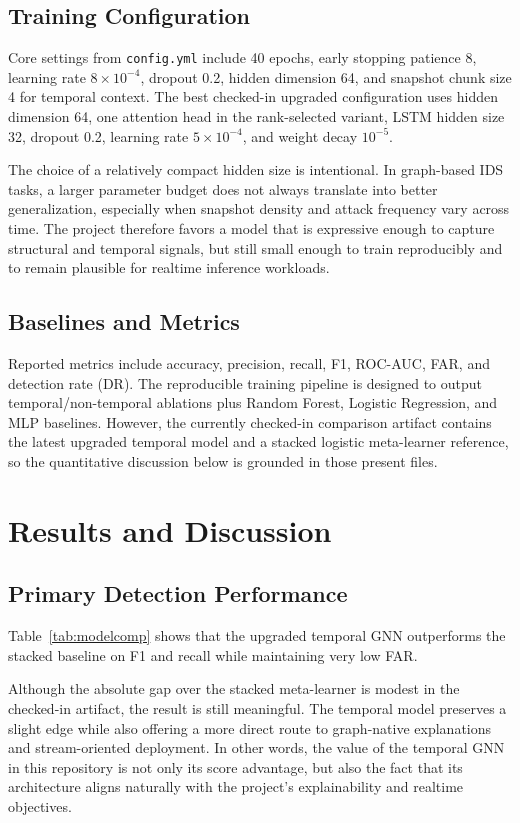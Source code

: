 \documentclass[conference]{IEEEtran}
\begin{document}
\subsection{Training Configuration}
Core settings from \texttt{config.yml} include 40 epochs, early stopping patience 8, learning rate $8\times10^{-4}$, dropout 0.2, hidden dimension 64, and snapshot chunk size 4 for temporal context. The best checked-in upgraded configuration uses hidden dimension 64, one attention head in the rank-selected variant, LSTM hidden size 32, dropout 0.2, learning rate $5\times10^{-4}$, and weight decay $10^{-5}$.

The choice of a relatively compact hidden size is intentional. In graph-based IDS tasks, a larger parameter budget does not always translate into better generalization, especially when snapshot density and attack frequency vary across time. The project therefore favors a model that is expressive enough to capture structural and temporal signals, but still small enough to train reproducibly and to remain plausible for realtime inference workloads.

\subsection{Baselines and Metrics}
Reported metrics include accuracy, precision, recall, F1, ROC-AUC, FAR, and detection rate (DR). The reproducible training pipeline is designed to output temporal/non-temporal ablations plus Random Forest, Logistic Regression, and MLP baselines. However, the currently checked-in comparison artifact contains the latest upgraded temporal model and a stacked logistic meta-learner reference, so the quantitative discussion below is grounded in those present files.

\section{Results and Discussion}
\subsection{Primary Detection Performance}
Table~\ref{tab:modelcomp} shows that the upgraded temporal GNN outperforms the stacked baseline on F1 and recall while maintaining very low FAR.

Although the absolute gap over the stacked meta-learner is modest in the checked-in artifact, the result is still meaningful. The temporal model preserves a slight edge while also offering a more direct route to graph-native explanations and stream-oriented deployment. In other words, the value of the temporal GNN in this repository is not only its score advantage, but also the fact that its architecture aligns naturally with the project's explainability and realtime objectives.
\end{document}

